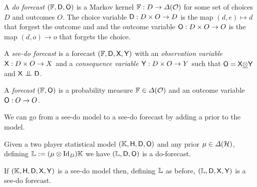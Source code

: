 \begin{definition}\label{def:do_forecast}
A \emph{do forecast} $(\mathbb{F},\mathsf{D},\mathsf{O})$ is a Markov kernel $\mathbb{F}:D\to \Delta(\mathcal{O})$ for some set of choices $D$ and outcomes $O$. The choice variable $\mathsf{D}:D\times O\to D$ is the map $(d,e)\mapsto d$ that forgest the outcome and and the outcome variable $\mathsf{O}:D\times O\to O$ is the map $(d,o)\to o$ that forgets the choice.

A \emph{see-do forecast} is a forecast $(\mathbb{F},\mathsf{D},\mathsf{X},\mathsf{Y})$ with an \emph{observation variable} $\mathsf{X}:D\times O\to X$ and a \emph{consequence variable} $\mathsf{Y}:D\times O\to Y$ such that $\mathsf{O}=\mathsf{X}\underline{\otimes}\mathsf{Y}$ and $\RV{X}\CI\RV{D}$.

A \emph{forecast} $(\mathbb{F},\mathsf{O})$ is a probability measure $\mathbb{F}\in\Delta(\mathcal{O})$ and an outcome variable $\mathsf{O}:O\to O$.
\end{definition}

We can go from a see-do model to a see-do forecast by adding a prior to the model.

\begin{theorem}
Given a two player statistical model $(\mathbb{K},\mathsf{H},\mathsf{D},\mathsf{O})$ and any prior $\mu\in \Delta(\mathcal{H})$, defining $\mathbb{L}:=(\mu\otimes \mathrm{Id}_D)\mathbb{K}$ we have $(\mathbb{L},\mathsf{D},\mathsf{O})$ is a do-forecast. 

If $(\mathbb{K},\mathsf{H},\mathsf{D},\mathsf{X},\mathsf{Y})$ is a see-do model then, defining $\mathbb{L}$ as before, $(\mathbb{L},\mathsf{D},\mathsf{X},\mathsf{Y})$ is a see-do forecast.
\end{theorem}


